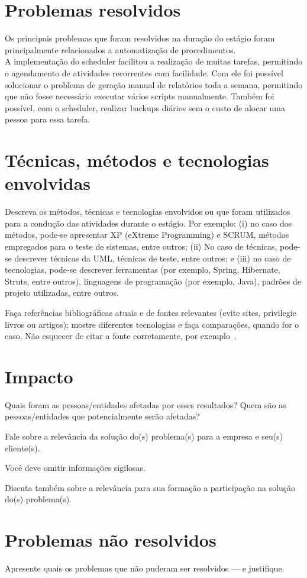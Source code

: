 \section{Problemas resolvidos}

Os principais problemas que foram resolvidos na duração do estágio foram principalmente relacionados a automatização de procedimentos.\\

A implementação do \gls{scheduler} facilitou a realização de muitas tarefas, permitindo o agendamento de atividades recorrentes com facilidade. Com ele foi possível solucionar o problema de geração manual de relatórios toda a semana, permitindo que não fosse necessário executar vários scripts manualmente. Também foi possível, com o \gls{scheduler}, realizar \glspl{backup} diários sem o custo de alocar uma pessoa para essa tarefa.\\

\section{Técnicas, métodos e tecnologias envolvidas}

Descreva os métodos, técnicas  e tecnologias
envolvidos  ou que  foram utilizados  para a  condução das  atividades
durante  o estágio.  Por exemplo:  (i)  no caso  dos métodos,  pode-se
apresentar XP (eXtreme Programming) e SCRUM, métodos empregados para o
teste de  sistemas, entre  outros; (ii) No  caso de  técnicas, pode-se
descrever técnicas da UML, técnicas de teste, entre outros; e (iii) no
caso  de  tecnologias,  pode-se descrever  ferramentas  (por  exemplo,
Spring, Hibernate,  Struts, entre  outros), linguagens  de programação
(por exemplo, Java), padrões de projeto utilizadas, entre outros.

Faça  referências bibliográficas  atuais e  de fontes
relevantes  (evite  sites,  privilegie   livros  ou  artigos);  mostre
diferentes  tecnologias e  faça comparações,  quando for  o caso.  Não
esquecer de citar a fonte corretamente, por exemplo~\cite{MichettiJavaMagazine2013}.

\section{Impacto}

Quais foram as pessoas/entidades afetadas por esses resultados? Quem são  as pessoas/entidades que potencialmente serão afetadas?

Fale sobre a relevância da solução do(s) problema(s) para a empresa e seu(s) cliente(s).

Você deve omitir informações sigilosas.

Discuta também sobre a relevância para sua formação a  participação na solução do(s) problema(s).

\section{Problemas não resolvidos}

Apresente quais os problemas que não puderam ser resolvidos --- e justifique.
